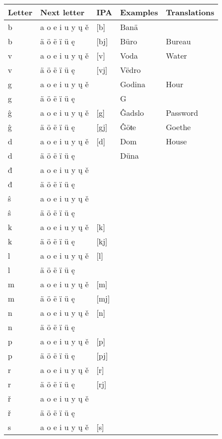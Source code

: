 \begin{longtable}{lllll}
		Letter & Next letter & IPA & Examples & Translations \\
		\endhead
		b & a o e i u y ų ě  & [b] & Banä & \\
		b & ä ö ë ï ü ę & [bj] & Büro & Bureau\\
		v & a o e i u y ų ě & [v] & Voda & Water \\
		v & ä ö ë ï ü ę & [vj] & Vëdro & \\
		g & a o e i u y ų ě & \textipa{[H]} & Godina & Hour \\
		g & ä ö ë ï ü ę & \textipa{[Hj]} & G & \\
		ĝ & a o e i u y ų ě & [g] & Ĝadslo & Password \\
		ĝ & ä ö ë ï ü ę & [gj] & Ĝöŧe & Goethe \\
		d & a o e i u y ų ě & [d] & Dom & House \\
		d & ä ö ë ï ü ę & \textipa{[\textbardotlessj]} & Düna & \\	
		đ & a o e i u y ų ě & \textipa{[\t{\:d\:z}]} & & \\
		đ & ä ö ë ï ü ę & \textipa{[\t{dZ}]} && \\
		ŝ & a o e i u y ų ě & \textipa{[\t{dz}]} && \\
		ŝ & ä ö ë ï ü ę & \textipa{[\t{dzj}]} && \\
		k & a o e i u y ų ě & [k] && \\  
		k & ä ö ë ï ü ę & [kj] && \\ 
		l & a o e i u y ų ě & [l] && \\  
		l & ä ö ë ï ü ę & \textipa{[L]} && \\ 
		m & a o e i u y ų ě & [m] && \\  
		m & ä ö ë ï ü ę & [mj] && \\
		n & a o e i u y ų ě & [n] && \\  
		n & ä ö ë ï ü ę & \textipa{[\textltailn]} && \\
		p & a o e i u y ų ě & [p] && \\  
		p & ä ö ë ï ü ę & [pj] && \\ 
		r & a o e i u y ų ě & [r] && \\  
		r & ä ö ë ï ü ę & [rj] && \\
		ř & a o e i u y ų ě & \textipa{[\r*r]} && \\  
		ř & ä ö ë ï ü ę & \textipa{[\r*rj]} && \\ 
		s & a o e i u y ų ě & [s] && \\  

\end{longtable}
